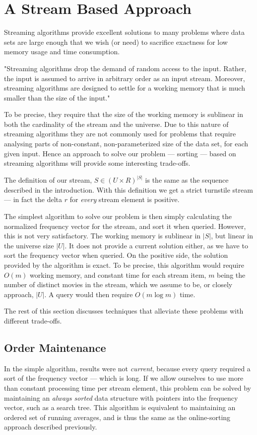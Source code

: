 \section{A Stream Based Approach}
Streaming algorithms provide excellent solutions to many problems where data
sets are large enough that we wish (or need) to sacrifice exactness for low
memory usage and time consumption.

\citet{lamport94}
"Streaming algorithms drop the demand of random access to the input. Rather, the input
is assumed to arrive in arbitrary order as an input stream. Moreover, streaming algorithms
are designed to settle for a working memory that is much smaller than the size
of the input."

To be precise, they require that the size of the working memory is sublinear in both the cardinality of the stream and the universe.
Due to this nature of streaming algorithms they are not commonly used for
problems that require analysing parts of non-constant, non-parameterized size
of the data set, for each given input. Hence an approach to
solve our problem --- sorting --- based on streaming algorithms will provide some interesting
trade-offs.

The definition of our stream, $S \in (U\times R)^{|S|}$ is the same as the
sequence described in the introduction. With this definition we get a strict
turnstile stream --- in fact the delta $r$ for \textit{every} stream element is
positive.

The simplest algorithm to solve our problem is then simply calculating the
normalized frequency vector for the stream, and sort it when queried.
However, this is not very satisfactory. The working memory is
sublinear in $|S|$, but linear in the universe size $|U|$. It
does not provide a current solution either, as we have to sort the frequency
vector when queried. On the positive side, the solution provided by the
algorithm is exact. To be precise, this algorithm would require $O(m)$ working
memory, and constant time for each stream item, $m$ being the number of distinct movies
in the stream, which we assume to be, or closely approach, $|U|$. A query would then
require $O(m \log m)$ time.

The rest of this section discusses techniques that alleviate these problems
with different trade-offs.

\subsection{Order Maintenance}
In the simple algorithm, results were not \textit{current}, because every query
required a sort of the frequency vector --- which is long. If we allow ourselves
to use more than constant processing time per stream element, this problem can
be solved by maintaining an \textit{always sorted} data structure with pointers
into the frequency vector, such as a search tree.
This algorithm is equivalent to maintaining an ordered set of running averages,
and is thus the same as the online-sorting approach described previously.

